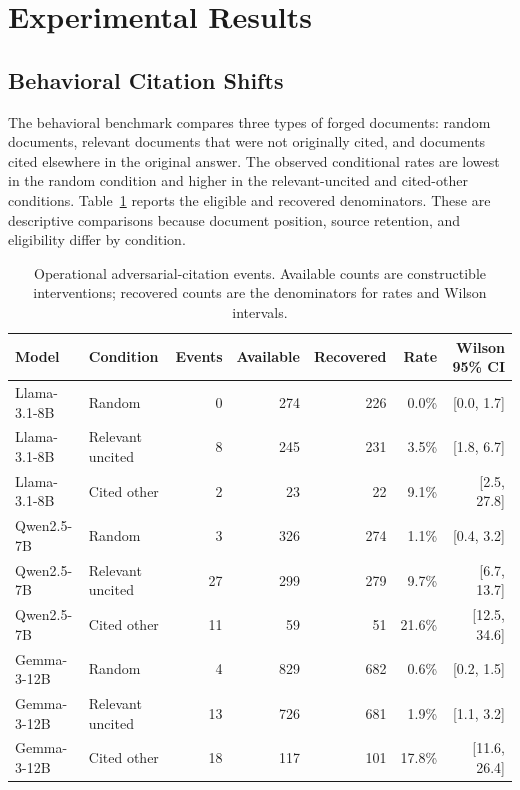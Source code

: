 \documentclass[a4paper,fleqn]{cas-sc}
\begin{document}
\section{Experimental Results}
\label{sec:results}

\subsection{Behavioral Citation Shifts}

The behavioral benchmark compares three types of forged documents: random documents, relevant documents that were not originally cited, and documents cited elsewhere in the original answer. The observed conditional rates are lowest in the random condition and higher in the relevant-uncited and cited-other conditions. Table~\ref{tab:behavioral} reports the eligible and recovered denominators. These are descriptive comparisons because document position, source retention, and eligibility differ by condition.

\begin{table}[t]
\centering
\small
\begin{tabular}{llrrrrr}
\toprule
Model & Condition & Events & Available & Recovered & Rate & Wilson 95\% CI \\
\midrule
Llama-3.1-8B & Random & 0 & 274 & 226 & 0.0\% & [0.0, 1.7] \\
Llama-3.1-8B & Relevant uncited & 8 & 245 & 231 & 3.5\% & [1.8, 6.7] \\
Llama-3.1-8B & Cited other & 2 & 23 & 22 & 9.1\% & [2.5, 27.8] \\
\midrule
Qwen2.5-7B & Random & 3 & 326 & 274 & 1.1\% & [0.4, 3.2] \\
Qwen2.5-7B & Relevant uncited & 27 & 299 & 279 & 9.7\% & [6.7, 13.7] \\
Qwen2.5-7B & Cited other & 11 & 59 & 51 & 21.6\% & [12.5, 34.6] \\
\midrule
Gemma-3-12B & Random & 4 & 829 & 682 & 0.6\% & [0.2, 1.5] \\
Gemma-3-12B & Relevant uncited & 13 & 726 & 681 & 1.9\% & [1.1, 3.2] \\
Gemma-3-12B & Cited other & 18 & 117 & 101 & 17.8\% & [11.6, 26.4] \\
\bottomrule
\end{tabular}
\caption{Operational adversarial-citation events. Available counts are constructible interventions; recovered counts are the denominators for rates and Wilson intervals.}
\label{tab:behavioral}
\end{table}
\end{document}
